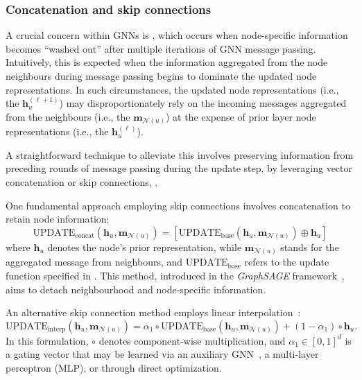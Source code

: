 \subsubsection{Concatenation and skip connections} 
A crucial concern within GNNs is , which occurs when node-specific information becomes ``washed out''  after multiple iterations of GNN message passing. Intuitively, this is expected when the information aggregated from the node neighbours during message passing begins to dominate the updated node representations. In such circumstances, the updated node representations (i.e., the $ \mathbf{h}_u^{(\ell+1)} $) may disproportionately rely on the incoming messages aggregated from the neighbours (i.e., the $ \mathbf{m}_{\mathcal{N}(u)} $) at the expense of prior layer node representations (i.e., the $ \mathbf{h}_u^{(\ell)} $).

A straightforward technique to alleviate this involves preserving information from preceding rounds of message passing during the update step, by leveraging vector concatenation or skip connections, .

\medskip

One fundamental approach employing skip connections involves concatenation to retain node information:
\begin{equation*}
\text{UPDATE}_{\text{concat}}(\mathbf{h}_u, \mathbf{m}_{\mathcal{N}(u)}) = [\text{UPDATE}_{\text{base}}(\mathbf{h}_u, \mathbf{m}_{\mathcal{N}(u)}) \oplus \mathbf{h}_u]
\end{equation*}
where $ \mathbf{h}_u $ denotes the node’s prior representation, while $ \mathbf{m}_{\mathcal{N}(u)}$ stands for the aggregated message from neighbours, and $ \text{UPDATE}_{\text{base}} $ refers to the update function specified in . This method, introduced in the \textit{GraphSAGE} framework~\cite{Hamilton2017inductiveRepresentationLearning}, aims to detach neighbourhood and node-specific information.

An alternative skip connection method employs linear interpolation~\cite{Pham2017columnNetworksCollectiveClassification}:
\begin{equation*}
\text{UPDATE}_{\text{interp}}(\mathbf{h}_u, \mathbf{m}_{\mathcal{N}(u)}) = \alpha_1 \circ \text{UPDATE}_{\text{base}}(\mathbf{h}_u, \mathbf{m}_{\mathcal{N}(u)}) + (1 - \alpha_1) \circ \mathbf{h}_u.
\end{equation*}
In this formulation, $ \circ $ denotes component-wise multiplication, and $ \alpha_1 \in [0,1]^d $ is a gating vector that may be learned via an auxiliary GNN~\cite{Pham2017columnNetworksCollectiveClassification}, a multi-layer perceptron (MLP), or through direct optimization.

